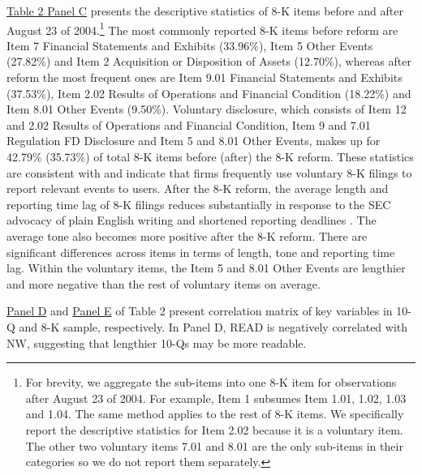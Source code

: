 \documentclass[letterpaper,11pt]{article}
\begin{document}
\begin{spacing}{1.5}
\hyperref[T2PC]{Table 2 Panel C} presents the descriptive statistics of 8-K items before and after August 23 of 2004.\footnote{For brevity, we aggregate the sub-items into one 8-K item for observations after August 23 of 2004. For example, Item 1 subsumes Item 1.01, 1.02, 1.03 and 1.04. The same method applies to the rest of 8-K items. We specifically report the descriptive statistics for Item 2.02 because it is a voluntary item. The other two voluntary items 7.01 and 8.01 are the only sub-items in their categories so we do not report them separately.} The most commonly reported 8-K items before reform are Item 7 Financial Statements and Exhibits (33.96\%), Item 5 Other Events (27.82\%) and Item 2 Acquisition or Disposition of Assets (12.70\%), whereas after reform the most frequent ones are Item 9.01 Financial Statements and Exhibits (37.53\%), Item 2.02 Results of Operations and Financial Condition (18.22\%) and Item 8.01 Other Events (9.50\%). Voluntary disclosure, which consists of Item 12 and 2.02 Results of Operations and Financial Condition, Item 9 and 7.01 Regulation FD Disclosure and Item 5 and 8.01 Other Events, makes up for 42.79\% (35.73\%) of total 8-K items before (after) the 8-K reform. These statistics are consistent with  and indicate that firms frequently use voluntary 8-K filings to report relevant events to users. After the 8-K reform, the average length and reporting time lag of 8-K filings reduces substantially in response to the SEC advocacy of plain English writing \cite{secDivisionCorporateFinance1999} and shortened reporting deadlines \cite{secFinalRuleAdditional2004}. The average tone also becomes more positive after the 8-K reform. There are significant differences across items in terms of length, tone and reporting time lag. Within the voluntary items, the Item 5 and 8.01 Other Events are lengthier and more negative than the rest of voluntary items on average.

\hyperref[T2PD]{Panel D} and \hyperref[T2PE]{Panel E} of Table 2 present correlation matrix of key variables in 10-Q and 8-K sample, respectively. In Panel D, READ is negatively correlated with NW, suggesting that lengthier 10-Qs may be more readable.


\end{spacing}
\end{document}
